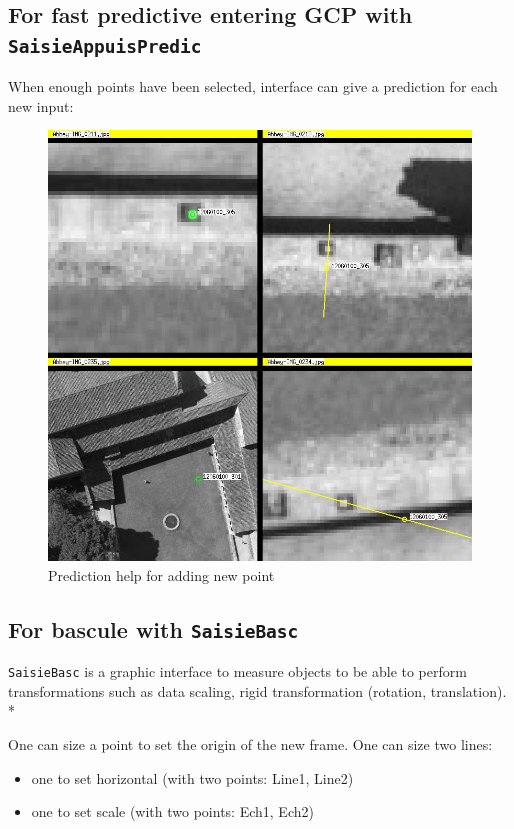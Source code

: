 \subsection{For fast predictive entering GCP with {\tt SaisieAppuisPredic}}

When enough points have been selected, interface can give a prediction for each new input:

\begin{figure}[H]
\begin{center}
\includegraphics[width=120mm]{FIGS/Saisie/prediction.jpg}
\end{center}
\caption{Prediction help for adding new point}
\label{FIG:SaisieAppuis:prediction}
\end{figure}

\subsection{For bascule with {\tt SaisieBasc}}
\label{SaisieBasc}

{\tt SaisieBasc} is a graphic interface to measure objects
to be able to perform transformations such as data scaling, rigid transformation (rotation, translation).\\*

One can size a point to set the origin of the new frame.
One can size two lines:
\begin{itemize}
\item one to set horizontal (with two points: Line1, Line2)
\item one to set scale (with two points: Ech1, Ech2)
\end{itemize}



